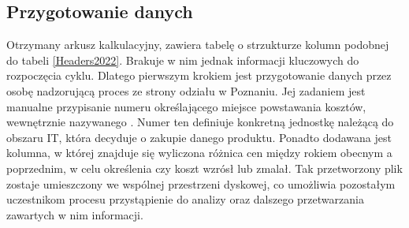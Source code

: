 \subsection{Przygotowanie danych}
Otrzymany arkusz kalkulacyjny, zawiera tabelę o strzukturze kolumn podobnej do tabeli \ref{Headers2022}. Brakuje w nim jednak informacji kluczowych do rozpoczęcia cyklu.
Dlatego pierwszym krokiem jest przygotowanie danych przez osobę nadzorującą proces ze strony odziału w Poznaniu. 
Jej zadaniem jest manualne przypisanie numeru określającego miejsce powstawania kosztów, wewnętrznie nazywanego . Numer ten definiuje konkretną jednostkę należącą do obszaru IT, która decyduje o zakupie danego produktu. Ponadto dodawana jest kolumna, w której znajduje się wyliczona różnica cen między rokiem obecnym a poprzednim, w celu określenia czy koszt wzrósł lub zmalał. Tak przetworzony plik zostaje umieszczony we wspólnej przestrzeni dyskowej, co umożliwia pozostałym uczestnikom procesu przystąpienie do analizy oraz dalszego przetwarzania zawartych w nim informacji.

\renewcommand{\arraystretch}{1.1} %
\begin{table}[t] %
    \begin{adjustwidth}{-50pt}{-20pt}
    \centering
    \caption{Nagłówki kolumn z arkusza kalkulacyjnego z roku 2022}
    \label{Headers2022}
    \end{adjustwidth}
\end{table}
